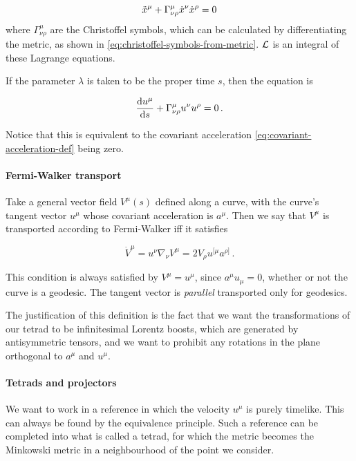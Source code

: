 \documentclass[main.tex]{subfiles}
\begin{document}
\begin{equation}
    \Ddot{x}^\mu + \Gamma^\mu_{\nu\rho} \Dot{x}^\nu \Dot{x}^\rho = 0
\end{equation}
where $\Gamma^\mu_{\nu \rho}$ are the Christoffel symbols, which can be calculated by differentiating the metric, as shown in \eqref{eq:christoffel-symbols-from-metric}. $\mathcal{L}$ is an integral of these Lagrange equations.

If the parameter $\lambda$ is taken to be the proper time $s$, then the equation is

\begin{equation}
    \dv{u^\mu}{s} + \Gamma^\mu _{\nu\rho} u^\nu u^\rho = 0 \,.
\end{equation}

Notice that this is equivalent to the covariant acceleration \eqref{eq:covariant-acceleration-def} being zero.

\paragraph{Fermi-Walker transport}

Take a general vector field \(V ^{\mu} (s)\) defined along a curve, with the curve's tangent vector \(u^\mu\) whose covariant acceleration is \(a^\mu\).
Then we say that \(V^\mu\) is transported according to Fermi-Walker iff it satisfies

\begin{equation} \label{eq:fermi-walker-transport}
    \dot{V}^\mu  = u^\nu \nabla_\nu V^\mu
    = 2 V_\rho u^{[\mu} a^{\rho]} \,.
\end{equation}

This condition is always satisfied by \(V^\mu = u^\mu\), since \(a^\mu u_\mu = 0\), whether or not the curve is a geodesic. The tangent vector is \emph{parallel} transported only for geodesics.

The justification of this definition is the fact that we want the transformations of our tetrad to be infinitesimal Lorentz boosts, which are generated by antisymmetric tensors, and we want to prohibit any rotations in the plane orthogonal to \(a^\mu\) and \(u^\mu\).

\paragraph{Tetrads and projectors} \label{par:tetrads}

We want to work in a reference in which the velocity $u^\mu$ is purely timelike. This can always be found by the equivalence principle. Such a reference can be completed into what  is called a tetrad, for which the metric becomes the Minkowski metric in a neighbourhood of the point we consider.
\end{document}
